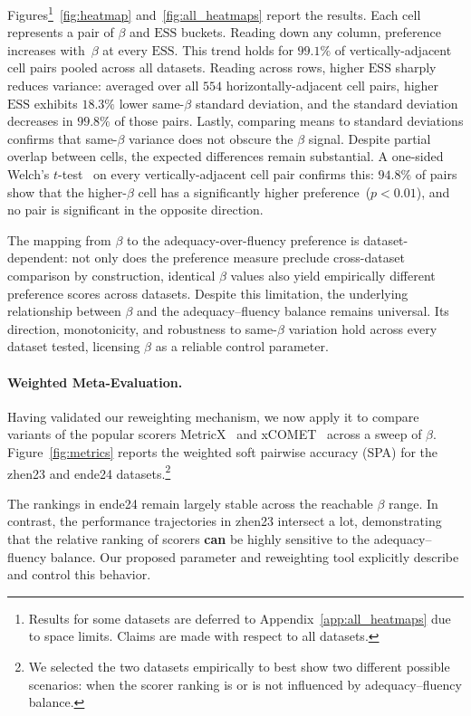 \documentclass[11pt]{article}
\begin{document}
Figures\footnote{Results for some datasets are deferred to Appendix~\ref{app:all_heatmaps} due to space limits. Claims are made with respect to all datasets.}~\ref{fig:heatmap} and~\ref{fig:all_heatmaps} report the results. Each cell represents a pair of $\beta$ and $\mathrm{ESS}$ buckets. Reading down any column, preference increases with~$\beta$ at every $\mathrm{ESS}$. This trend holds for $99.1\%$ of vertically-adjacent cell pairs pooled across all datasets. Reading across rows, higher $\mathrm{ESS}$  sharply reduces variance: averaged over all $554$ horizontally-adjacent cell pairs, higher $\mathrm{ESS}$ exhibits $18.3\%$ lower same-$\beta$ standard deviation, and the standard deviation decreases in $99.8\%$ of those pairs. Lastly, comparing means to standard deviations confirms that same-$\beta$ variance does not obscure the $\beta$ signal. Despite partial overlap between cells, the expected differences remain substantial. A one-sided Welch's $t$-test~\citep{a967ba42-d0b9-3e65-976f-80cc6086b406} on every vertically-adjacent cell pair confirms this: $94.8\%$ of pairs show that the higher-$\beta$ cell has a significantly higher preference~($p{<}0.01$), and no pair is significant in the opposite direction.

The mapping from $\beta$ to the adequacy-over-fluency preference is dataset-dependent: not only does the preference measure preclude cross-dataset comparison by construction, identical $\beta$ values also yield empirically different preference scores across datasets. Despite this limitation, the underlying relationship between $\beta$ and the adequacy–fluency balance remains universal. Its direction, monotonicity, and robustness to same-$\beta$ variation hold across every dataset tested, licensing $\beta$ as a reliable control parameter.

\paragraph{Weighted Meta-Evaluation.}
Having validated our reweighting mechanism, we now apply it to compare variants of the popular scorers MetricX~\citep{juraska-etal-2024-metricx} and xCOMET~\citep{10.1162/tacl_a_00683} across a sweep of $\beta$. Figure~\ref{fig:metrics} reports the weighted soft pairwise accuracy (SPA) for the zhen23 and ende24 datasets.\footnote{We selected the two datasets empirically to best show two different possible scenarios: when the scorer ranking is or is not influenced by adequacy–fluency balance.}

The rankings in ende24 remain largely stable across the reachable $\beta$ range. In contrast, the performance trajectories in zhen23 intersect a lot, demonstrating that the relative ranking of scorers \textbf{can} be highly sensitive to the adequacy--fluency balance. Our proposed parameter and reweighting tool explicitly describe and control this behavior.
\end{document}
